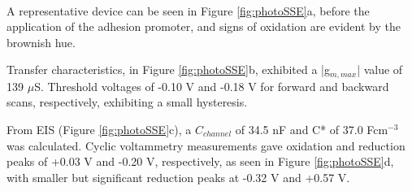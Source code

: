 \hspace{3cm}  \\ 

A representative device can be seen in Figure \ref{fig:photoSSE}a, before the application of the adhesion promoter, and signs of oxidation are evident by the brownish hue. 

Transfer characteristics, in Figure \ref{fig:photoSSE}b, exhibited a |g$_{m,max}$| value of 139 $\mu$S. Threshold voltages of -0.10 V and -0.18 V for forward and backward scans, respectively, exhibiting a small hysteresis. 

From EIS (Figure \ref{fig:photoSSE}c), a $C_{channel}$ of 34.5 nF and C* of 37.0 Fcm$^{-3}$ was calculated. Cyclic voltammetry measurements gave oxidation and reduction peaks of +0.03 V and -0.20 V, respectively, as seen in Figure \ref{fig:photoSSE}d, with smaller but significant reduction peaks at -0.32 V and +0.57 V.

